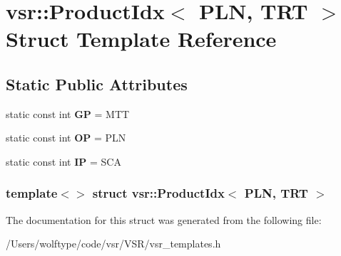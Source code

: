 \hypertarget{structvsr_1_1_product_idx_3_01_p_l_n_00_01_t_r_t_01_4}{\section{vsr\-:\-:Product\-Idx$<$ P\-L\-N, T\-R\-T $>$ Struct Template Reference}
\label{structvsr_1_1_product_idx_3_01_p_l_n_00_01_t_r_t_01_4}
}
\subsection*{Static Public Attributes}
\begin{DoxyCompactItemize}
\item 
\hypertarget{structvsr_1_1_product_idx_3_01_p_l_n_00_01_t_r_t_01_4_a0c4aec7d826371588fab5c1be5de7f8c}{static const int {\bfseries G\-P} = M\-T\-T}\label{structvsr_1_1_product_idx_3_01_p_l_n_00_01_t_r_t_01_4_a0c4aec7d826371588fab5c1be5de7f8c}

\item 
\hypertarget{structvsr_1_1_product_idx_3_01_p_l_n_00_01_t_r_t_01_4_a3c46b563916399ef9baad245b5e05e4f}{static const int {\bfseries O\-P} = P\-L\-N}\label{structvsr_1_1_product_idx_3_01_p_l_n_00_01_t_r_t_01_4_a3c46b563916399ef9baad245b5e05e4f}

\item 
\hypertarget{structvsr_1_1_product_idx_3_01_p_l_n_00_01_t_r_t_01_4_a25ecf60fbc811e4067f7f33365fe44e7}{static const int {\bfseries I\-P} = S\-C\-A}\label{structvsr_1_1_product_idx_3_01_p_l_n_00_01_t_r_t_01_4_a25ecf60fbc811e4067f7f33365fe44e7}

\end{DoxyCompactItemize}
\subsubsection*{template$<$$>$ struct vsr\-::\-Product\-Idx$<$ P\-L\-N, T\-R\-T $>$}



The documentation for this struct was generated from the following file\-:\begin{DoxyCompactItemize}
\item 
/\-Users/wolftype/code/vsr/\-V\-S\-R/vsr\-\_\-templates.\-h\end{DoxyCompactItemize}
